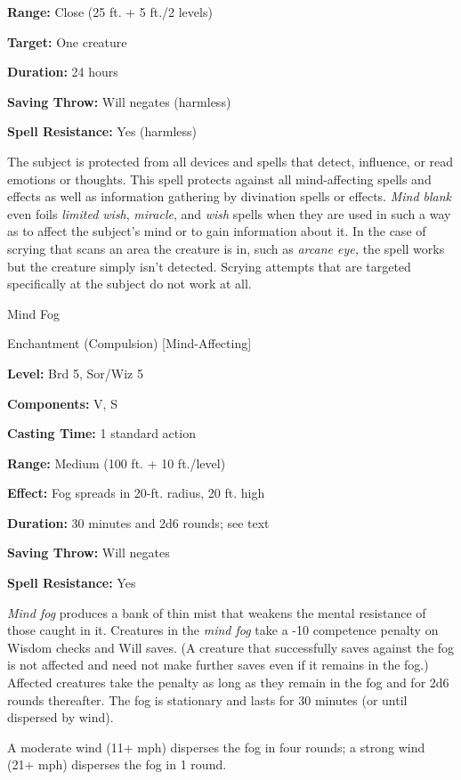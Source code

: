 \documentclass{article}
\begin{document}
\textbf{Range:} Close (25 ft. + 5 ft./2 levels)

\textbf{Target:} One creature

\textbf{Duration:} 24 hours

\textbf{Saving Throw: }Will negates (harmless)

\textbf{Spell Resistance:} Yes (harmless)

The subject is protected from all devices and spells that detect, influence, or 
read emotions or thoughts. This spell protects against all mind-affecting spells 
and effects as well as information gathering by divination spells or effects. \textit{Mind 
blank }even foils \textit{limited wish}, \textit{miracle}, and \textit{wish }spells 
when they are used in such a way as to affect the subject's mind or to gain information 
about it. In the case of scrying that scans an area the creature is in, such as 
\textit{arcane eye, }the spell works but the creature simply isn't detected. Scrying 
attempts that are targeted specifically at the subject do not work at all.

\vspace{12pt}
Mind Fog

Enchantment (Compulsion) [Mind-Affecting]

\textbf{Level:} Brd 5, Sor/Wiz 5

\textbf{Components:} V, S

\textbf{Casting Time:} 1 standard action

\textbf{Range: }Medium (100 ft. + 10 ft./level)

\textbf{Effect:} Fog spreads in 20-ft. radius, 20 ft. high

\textbf{Duration:} 30 minutes and 2d6 rounds; see text

\textbf{Saving Throw: }Will negates

\textbf{Spell Resistance:} Yes

\textit{Mind fog }produces a bank of thin mist that weakens the mental resistance 
of those caught in it. Creatures in the \textit{mind fog }take a -10 competence 
penalty on Wisdom checks and Will saves. (A creature that successfully saves against 
the fog is not affected and need not make further saves even if it remains in the 
fog.) Affected creatures take the penalty as long as they remain in the fog and 
for 2d6 rounds thereafter. The fog is stationary and lasts for 30 minutes (or until 
dispersed by wind).

A moderate wind (11+ mph) disperses the fog in four rounds; a strong wind (21+ 
mph) disperses the fog in 1 round.
\end{document}
